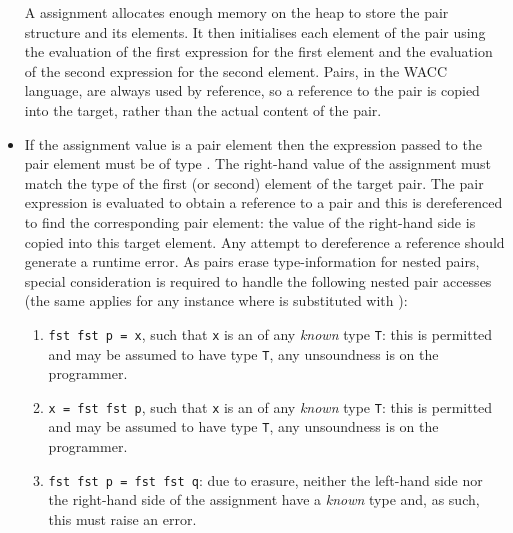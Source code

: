 \documentclass[a4paper]{article}
\theoremstyle{definition}
\begin{document}
\begin{itemize}
       A  assignment allocates enough memory on the heap to store the pair structure and its elements.
       It then initialises each element of the pair using the evaluation of the first expression for the first element
       and the evaluation of the second expression for the second element.
       Pairs, in the WACC language, are always used by reference, so a reference to the pair is copied into the target, rather than the actual content of the pair.
 \item If the assignment value is a pair element  then the expression passed to the pair element
       must be of type . The right-hand value of the assignment must match the type of the first (or
       second) element of the target pair.
       The pair expression is evaluated to obtain a reference to a pair and this is dereferenced to find the corresponding pair element: the value of the right-hand side is copied
       into this target element.
       Any attempt to dereference a  reference should generate a runtime error.
       As pairs erase type-information for nested pairs, special consideration is required to handle the following nested pair
       accesses (the same applies for any instance where  is substituted with ):

       \begin{enumerate}
          \item \texttt{fst fst p = x}, such that \texttt{x} is an  of any \emph{known} type \texttt{T}: this is
                permitted and  may be assumed to have type \texttt{T}, any unsoundness is on the programmer.
          \item \texttt{x = fst fst p}, such that \texttt{x} is an  of any \emph{known} type \texttt{T}: this is
                permitted and  may be assumed to have type \texttt{T}, any unsoundness is on the programmer.
          \item \texttt{fst fst p = fst fst q}: due to erasure, neither the left-hand side nor the right-hand side of the assignment
                have a \emph{known} type and, as such, this must raise an error.
       \end{enumerate}

 \end{itemize}
\end{document}
